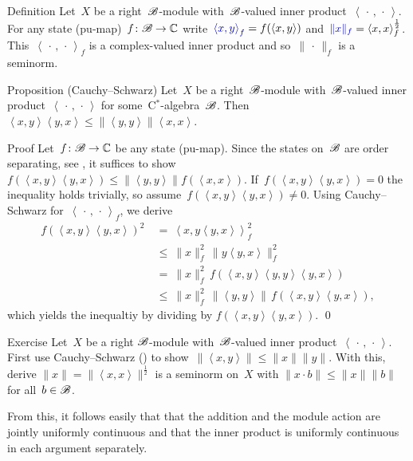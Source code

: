 \documentclass[b]{subfiles}
\begin{document}
\begin{parsec}%
\begin{point}{Definition}%
Let~$X$ be a right~$\mathscr{B}$-module with~$\mathscr{B}$-valued inner
    product~$\left<\,\cdot\,,\,\cdot\,\right>$.
For any state (pu-map)~$f\colon \mathscr{B} \to \mathbb{C}$
    write~$\Define{\left<x,y\right>_f} = f(\left<x,y\right>)$
    and~$\Define{\|x\|_f} = \left<x,x\right>^{\frac{1}{2}}_f$.
This~$\left<\,\cdot\,,\,\cdot\,\right>_f$
    is a complex-valued inner product
    and so~$\|\,\cdot\,\|_f$ is a seminorm.
\end{point}
\begin{point}[module-CS]{Proposition (Cauchy--Schwarz)}%
Let~$X$ be a right~$\mathscr{B}$-module
    with~$\mathscr{B}$-valued inner product~$\left<\,\cdot\,,\,\cdot\,\right>$
    for some~C$^*$-algebra~$\mathscr{B}$.
Then~$\left<x,y\right>\left<y,x\right> \leq \|\left<y,y\right>\| \left<x,x\right>$.
\begin{point}{Proof}%
Let~$f\colon \mathscr{B} \to \mathbb{C}$ be any state (pu-map).
Since the states on~$\mathscr{B}$ are order separating,
see ,
it suffices to show~$f(\left<x,y\right>\left<y,x\right>)
\leq \|\left<y,y\right>\| f(\left<x,x\right>)$.
If~$f(\left<x,y\right>\left<y,x\right>) = 0$
the inequality holds trivially,
so assume~$f(\left<x,y\right>\left<y,x\right>) \neq 0$.
Using Cauchy--Schwarz for~$\left<\,\cdot\,,\,\cdot\,\right>_f$,
    we derive
\begin{align*}
    f(\left<x,y\right>\left<y,x\right>)^2
        &\  =\  \left<x,y\left<y,x\right>\right>_f^2 \\
        &\  \leq\  \|x\|_f^2 \, \|y \left<y,x\right>\|_f^2 \\
    & \ =\  \|x\|_f^2\, f(\left<x,y\right>\left<y,y\right>\left<y,x\right>)\\
    & \ \leq\  \|x\|_f^2 \,
    \|\left<y,y\right>\| \,
    f(\left<x,y\right>\left<y,x\right>),
\end{align*}
    which yields the inequaltiy by dividing by
$f(\left<x,y\right>\left<y,x\right>)$. \qed
\end{point}
\end{point}
\begin{point}{Exercise}
Let~$X$ be a right $\mathscr{B}$-module
    with~$\mathscr{B}$-valued inner product~$\left<\,\cdot\,,\,\cdot\,\right>$.
First use Cauchy--Schwarz ()
    to show~$\|\left<x,y\right>\| \leq \|x\|\|y\|$.
With this, derive $\|x\| =\|\left<x,x\right>\|^{\frac{1}{2}}$ is a seminorm on~$X$ with
    $\|x \cdot b \| \leq \|x\|\|b\|$
    for all~$b \in \mathscr{B}$.
\begin{point}%
From this, it follows easily that
that the addition and the module action
are jointly uniformly continuous
    and that the inner product is uniformly continuous in each argument
    separately.
\end{point}
\end{point}
\end{parsec}
\end{document}
